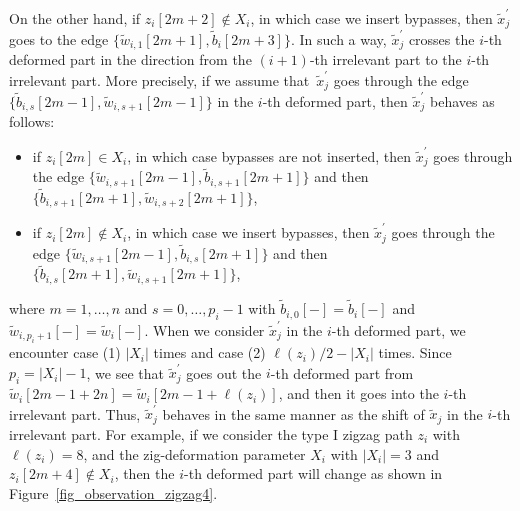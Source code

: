 \documentclass[pdftex]{sigma}%
\numberwithin{equation}{section}
\numberwithin{figure}{section}
\numberwithin{table}{section}
\begin{document}
\begin{observation}
On the other hand, if $z_i[2m+2]\not\in X_i$, in which case we insert bypasses, then $\widetilde{x}^\prime_j$ goes to the edge $\big\{\widetilde{w}_{i,1}[2m+1], \widetilde{b}_i[2m+3]\big\}$.
In such a way, $\widetilde{x}^\prime_j$ crosses the $i$-th deformed part in the direction from the $(i+1)$-th irrelevant part to the $i$-th irrelevant part.
More precisely, if we assume that~$\widetilde{x}^\prime_j$ goes through the edge $\{\widetilde{b}_{i,s}[2m-1], \widetilde{w}_{i,s+1}[2m-1]\}$ in the $i$-th deformed part,
then $\widetilde{x}^\prime_j$ behaves as follows:
\begin{itemize}\itemsep=0pt
\item[(1)] if $z_i[2m]\in X_i$, in which case bypasses are not inserted, then $\widetilde{x}^\prime_j$ goes through the edge $\big\{\widetilde{w}_{i,s+1}[2m-1],\widetilde{b}_{i,s+1}[2m+1]\big\}$ and then $\big\{\widetilde{b}_{i,s+1}[2m+1], \widetilde{w}_{i,s+2}[2m+1]\big\}$,
\item[(2)] if $z_i[2m]\not\in X_i$, in which case we insert bypasses, then $\widetilde{x}^\prime_j$ goes through the edge $\big\{\widetilde{w}_{i,s+1}[2m-1], \widetilde{b}_{i,s}[2m+1]\big\}$ and then $\big\{\widetilde{b}_{i,s}[2m+1], \widetilde{w}_{i,s+1}[2m+1]\big\}$,
\end{itemize}
where $m=1,\dots,n$ and $s=0,\dots,p_i-1$ with $\widetilde{b}_{i,0}[-]=\widetilde{b}_i[-]$ and $\widetilde{w}_{i,p_i+1}[-]=\widetilde{w}_i[-]$.
When we consider $\widetilde{x}^\prime_j$ in the $i$-th deformed part, we encounter case (1) $|X_i|$ times and case (2) $\ell(z_i)/2-|X_i|$ times.
Since $p_i=|X_i|-1$, we see that $\widetilde{x}^\prime_j$ goes out the $i$-th deformed part from $\widetilde{w}_i[2m-1+2n]=\widetilde{w}_i[2m-1+\ell(z_i)]$,
and then it goes into the $i$-th irrelevant part.
Thus, $\widetilde{x}^\prime_j$ behaves in the same manner as the shift of $\widetilde{x}_j$ in the $i$-th irrelevant part.
For example, if we consider the type I zigzag path $z_i$ with $\ell(z_i)=8$, and the zig-deformation parameter $X_i$ with $|X_i|=3$ and $z_i[2m+4]\not\in X_i$, then the $i$-th deformed part will change as shown in Figure~\ref{fig_observation_zigzag4}.

\begin{figure}[h!]\centering
{}
\end{figure}
\end{observation}
\end{document}
